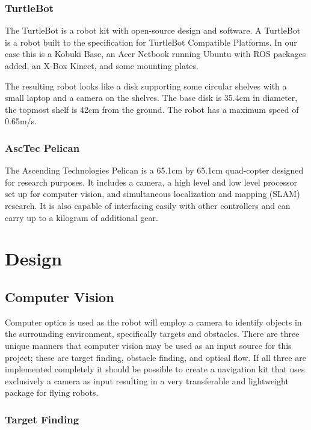 \documentclass{article}
\begin{document}
		\subsubsection{TurtleBot}
		
		The TurtleBot is a robot kit with open-source design and software. A TurtleBot is a robot built to the specification for TurtleBot Compatible Platforms\cite{wise_foote_2011}. In our case this is a Kobuki Base, an Acer Netbook running Ubuntu with ROS packages added, an X-Box Kinect, and some mounting plates. 
		
		The resulting robot looks like a disk supporting some circular shelves with a small laptop and a camera on the shelves. The base disk is 35.4cm in diameter, the topmost shelf is 42cm from the ground. The robot has a maximum speed of 0.65m/s. 
		
		\subsubsection{AscTec Pelican}
		
		The Ascending Technologies Pelican is a 65.1cm by 65.1cm quad-copter designed for research purposes\cite{asctec}. It includes a camera, a high level and low level processor set up for computer vision, and simultaneous localization and mapping (SLAM) research. It is also capable of interfacing easily with other controllers and can carry up to a kilogram of additional gear.
		
\section{Design}
	
	\subsection{Computer Vision}
	
	Computer optics is used as the robot will employ a camera to identify objects in the surrounding environment, specifically targets and obstacles. There are three unique manners that computer vision may be used as an input source for this project; these are target finding, obstacle finding, and optical flow. If all three are implemented completely it should be possible to create a navigation kit that uses exclusively a camera as input resulting in a very transferable and lightweight package for flying robots.
	
		\subsubsection{Target Finding}
		
\end{document}

